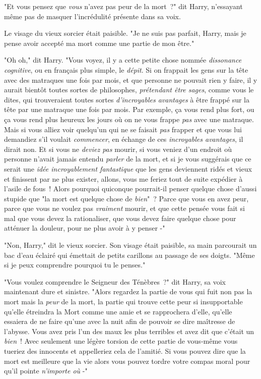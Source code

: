 "Et vous pensez que \emph{vous} n'avez pas peur de la mort~?" dit Harry, n'essayant même pas de masquer l'incrédulité présente dans sa voix.

Le visage du vieux sorcier était paisible. "Je ne suis pas parfait, Harry, mais je pense avoir accepté ma mort comme une partie de mon être."

"Oh oh," dit Harry. "Vous voyez, il y a cette petite chose nommée \emph{dissonance cognitive}, ou en français plus simple, le \emph{dépit}. Si on frappait les gens sur la tête avec des matraques une fois par mois, et que personne ne pouvait rien y faire, il y aurait bientôt toutes sortes de philosophes, \emph{prétendant être sages}, comme vous le dites, qui trouveraient toutes sortes \emph{d'incroyables avantages} à être frappé sur la tête par une matraque une fois par mois. Par exemple, ça vous rend plus fort, ou ça vous rend plus heureux les jours où on ne vous frappe \emph{pas} avec une matraque. Mais si vous alliez voir quelqu'un qui ne se faisait \emph{pas} frapper et que vous lui demandiez s'il voulait \emph{commencer}, en échange de ces \emph{incroyables avantages}, il dirait non. Et si vous ne \emph{deviez pas} mourir, si vous veniez d'un endroit où personne n'avait jamais entendu \emph{parler} de la mort, et si je vous suggérais que ce serait une \emph{idée incroyablement fantastique} que les gens deviennent ridés et vieux et finissent par ne plus exister, allons, vous me feriez tout de suite expédier à l'asile de fous~! Alors pourquoi quiconque pourrait-il penser quelque chose d'aussi stupide que "la mort est quelque chose de \emph{bien}"~? Parce que vous en avez peur, parce que vous ne voulez pas \emph{vraiment} mourir, et que cette pensée vous fait si mal que vous devez la rationaliser, que vous devez faire quelque chose pour atténuer la douleur, pour ne plus avoir à y penser -"

"Non, Harry," dit le vieux sorcier. Son visage était paisible, sa main parcourait un bac d'eau éclairé qui émettait de petits carillons au passage de ses doigts. "Même si je peux comprendre pourquoi tu le penses."

"Vous voulez comprendre le Seigneur des Ténèbres~?" dit Harry, sa voix maintenant dure et sinistre. "Alors regardez la partie de vous qui fuit non pas la mort mais la \emph{peur} de la mort, la partie qui trouve cette peur si insupportable qu'elle étreindra la Mort comme une amie et se rapprochera d'elle, qu'elle essaiera de ne faire qu'une avec la nuit afin de pouvoir se dire maîtresse de l'abysse. Vous avez pris l'un des maux les plus terribles et avez dit que c'était un \emph{bien}~! Avec seulement une légère torsion de cette partie de vous-même vous tueriez des innocents et appelleriez cela de l'amitié. Si vous pouvez dire que la mort est meilleure que la vie alors vous pouvez tordre votre compas moral pour qu'il pointe \emph{n'importe où} -"

